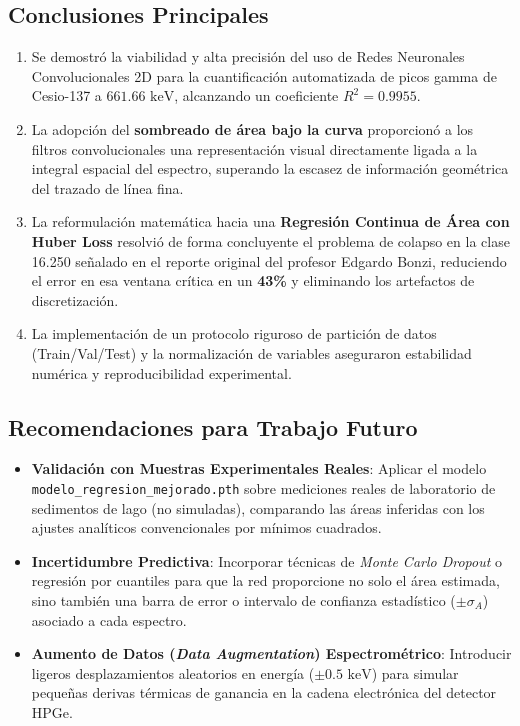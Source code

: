 \documentclass[11pt,a4paper]{article}
\begin{document}
\subsection{Conclusiones Principales}
\begin{enumerate}
    \item Se demostró la viabilidad y alta precisión del uso de Redes Neuronales Convolucionales 2D para la cuantificación automatizada de picos gamma de Cesio-137 a $661.66\text{ keV}$, alcanzando un coeficiente $R^2 = 0.9955$.
    \item La adopción del \textbf{sombreado de área bajo la curva} proporcionó a los filtros convolucionales una representación visual directamente ligada a la integral espacial del espectro, superando la escasez de información geométrica del trazado de línea fina.
    \item La reformulación matemática hacia una \textbf{Regresión Continua de Área con Huber Loss} resolvió de forma concluyente el problema de colapso en la clase 16.250 señalado en el reporte original del profesor Edgardo Bonzi, reduciendo el error en esa ventana crítica en un \textbf{43\%} y eliminando los artefactos de discretización.
    \item La implementación de un protocolo riguroso de partición de datos (Train/Val/Test) y la normalización de variables aseguraron estabilidad numérica y reproducibilidad experimental.
\end{enumerate}

\subsection{Recomendaciones para Trabajo Futuro}
\begin{itemize}
    \item \textbf{Validación con Muestras Experimentales Reales}: Aplicar el modelo \texttt{modelo\_regresion\_mejorado.pth} sobre mediciones reales de laboratorio de sedimentos de lago (no simuladas), comparando las áreas inferidas con los ajustes analíticos convencionales por mínimos cuadrados.
    \item \textbf{Incertidumbre Predictiva}: Incorporar técnicas de \textit{Monte Carlo Dropout} o regresión por cuantiles para que la red proporcione no solo el área estimada, sino también una barra de error o intervalo de confianza estadístico ($\pm \sigma_A$) asociado a cada espectro.
    \item \textbf{Aumento de Datos (\textit{Data Augmentation}) Espectrométrico}: Introducir ligeros desplazamientos aleatorios en energía ($\pm 0.5\text{ keV}$) para simular pequeñas derivas térmicas de ganancia en la cadena electrónica del detector HPGe.
\end{itemize}
\end{document}
